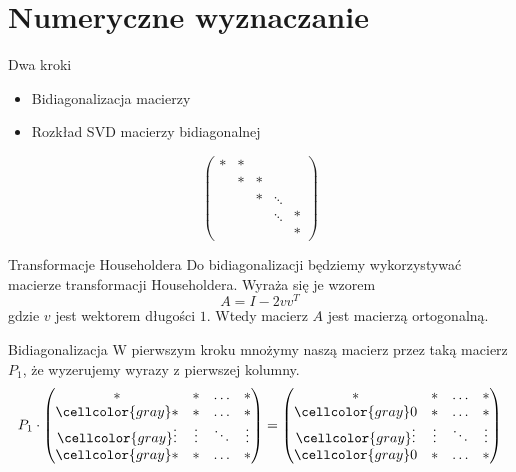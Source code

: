 \documentclass{beamer}
\newcommand{\szary}{\cellcolor{gray}}
\begin{document}
\section{Numeryczne wyznaczanie}
\begin{frame}{Dwa kroki}
\begin{itemize}
    \item Bidiagonalizacja macierzy
    \item Rozkład SVD macierzy bidiagonalnej
\end{itemize}

$$ \begin{pmatrix} \ast & \ast & & & \\ & \ast & \ast & & \\ & & \ast & \ddots & \\ & & & \ddots & \ast \\ & & & & \ast \end{pmatrix} $$
    
\end{frame}

\begin{frame}{Transformacje Householdera}
Do bidiagonalizacji będziemy wykorzystywać macierze transformacji Householdera. Wyraża się je wzorem
$$A = I - 2vv^T $$
gdzie $v$ jest wektorem długości $1$. Wtedy macierz $A$ jest macierzą ortogonalną.
\end{frame}

\begin{frame}{Bidiagonalizacja}
W pierwszym kroku mnożymy naszą macierz przez taką macierz $P_1$, że wyzerujemy wyrazy z pierwszej kolumny.
$$ P_1 \cdot \begin{pmatrix} \ast & \ast & \ldots & \ast \\
\szary \ast & \ast & \ldots & \ast \\
\szary \vdots & \vdots & \ddots & \vdots \\
\szary \ast & \ast & \ldots & \ast
\end{pmatrix}
=
\begin{pmatrix} \ast & \ast & \ldots & \ast \\
\szary 0 & \ast & \ldots & \ast \\
 \szary \vdots & \vdots & \ddots & \vdots \\
\szary 0 & \ast & \ldots & \ast
\end{pmatrix}$$
\end{frame}
\end{document}
